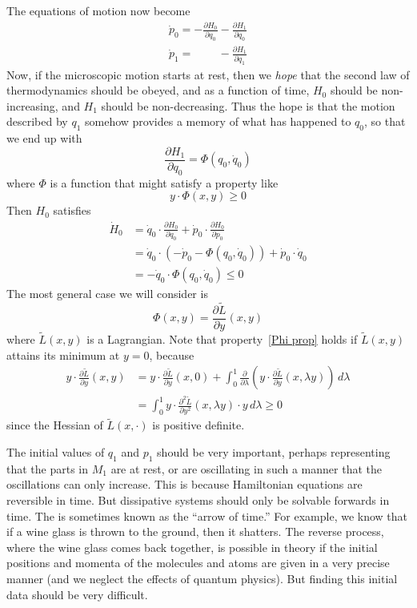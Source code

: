 \documentclass{amsart}
\begin{document}
The equations of motion now become
\begin{gather}
\dot p_0 = - \frac{\partial H_0}{\partial q_0} - \frac{\partial H_1}{\partial q_0} \\
\dot p_1 = \phantom{- \frac{\partial H_0}{\partial q_1}} - \frac{\partial H_1}{\partial q_1} 
\end{gather}
Now, if the microscopic motion starts at rest, then we \emph{hope} that the second law of thermodynamics should be obeyed, and as a function of time, $H_0$ should be non-increasing, and $H_1$ should be non-decreasing.   Thus the hope is that the motion described by $q_1$ somehow provides a memory of what has happened to $q_0$, so that we end up with
\begin{equation}
\frac{\partial H_1}{\partial q_0} = \Phi(q_0,\dot q_0)
\end{equation}
where $\Phi$ is a function that might satisfy a property like
\begin{equation}
\label{Phi prop}
y \cdot \Phi(x,y) \ge 0
\end{equation}
Then $H_0$ satisfies
\begin{align}
\dot H_0 &= \dot q_0 \cdot \frac{\partial H_0}{\partial q_0} + \dot p_0 \cdot \frac{\partial H_0}{\partial p_0} \\
&= \dot q_0 \cdot (-\dot p_0 - \Phi(q_0,\dot q_0)) + \dot p_0 \cdot \dot q_0 \\
&= - \dot q_0 \cdot \Phi(q_0, \dot q_0) \le 0
\end{align}
The most general case we will consider is
\begin{equation}
\Phi(x,y) = \frac{\partial \tilde L}{\partial y}(x,y)
\end{equation}
where $\tilde L(x,y)$ is a Lagrangian.  Note that property~\eqref{Phi prop} holds if $\tilde L(x,y)$ attains its minimum at $y = 0$, because
\begin{equation}
\begin{aligned}
y \cdot \frac{\partial \tilde L}{\partial y}(x,y)
&= y \cdot \frac{\partial \tilde L}{\partial y}(x,0) + \int_0^1 \frac\partial{\partial \lambda} \left( y \cdot \frac{\partial \tilde L}{\partial y}(x,\lambda y) \right) \, d\lambda \\
&= \int_0^1 y \cdot \frac{\partial^2 \tilde L}{\partial y^2}(x,\lambda y) \cdot y \, d\lambda \ge 0
\end{aligned}
\end{equation}
since the Hessian of $\tilde L(x,\cdot)$ is positive definite.

The initial values of $q_1$ and $p_1$ should be very important, perhaps representing that the parts in $M_1$ are at rest, or are oscillating in such a manner that the oscillations can only increase.  This is because Hamiltonian equations are reversible in time.  But dissipative systems should only be solvable forwards in time.  The is sometimes known as the ``arrow of time.''  For example, we know that if a wine glass is thrown to the ground, then it shatters.  The reverse process, where the wine glass comes back together, is possible in theory if the initial positions and momenta of the molecules and atoms are given in a very precise manner (and we neglect the effects of quantum physics).  But finding this initial data should be very difficult.
\end{document}
